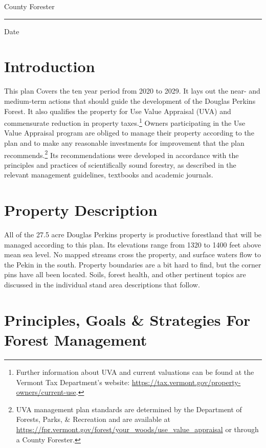 \documentclass[]{tufte-handout}
\begin{document}
\noindent County Forester \rule{7cm}{0pt} Date

\pagebreak

\section{Introduction}\label{introduction}

This plan Covers the ten year period from 2020 to 2029. It lays out the
near- and medium-term actions that should guide the development of the
Douglas Perkins Forest. It also qualifies the property for Use Value
Appraisal (UVA) and commensurate reduction in property taxes.\footnote{Further
  information about UVA and current valuations can be found at the
  Vermont Tax Department's website:
  \url{https://tax.vermont.gov/property-owners/current-use}.
  \vspace{20pt}} Owners participating in the Use Value Appraisal program
are obliged to manage their property according to the plan and to make
any reasonable investments for improvement that the plan
recommends.\footnote{UVA management plan standards are determined by the
  Department of Forests, Parks, \& Recreation and are available at
  \url{https://fpr.vermont.gov/forest/your_woods/use_value_appraisal} or
  through a County Forester.} Its recommendations were developed in
accordance with the principles and practices of scientifically sound
forestry, as described in the relevant management guidelines, textbooks
and academic journals\cite{@halligan_relative_1999}.

\section{Property Description}\label{property-description}

All of the 27.5 acre Douglas Perkins property is productive forestland
that will be managed according to this plan. Its elevations range from
1320 to 1400 feet above mean sea level. No mapped streams cross the
property, and surface waters flow to the Pekin in the south. Property
boundaries are a bit hard to find, but the corner pins have all been
located. Soils, forest health, and other pertinent topics are discussed
in the individual stand area descriptions that follow.

\section{Principles, Goals \& Strategies For Forest
Management}\label{principles-goals-strategies-for-forest-management}
\end{document}

